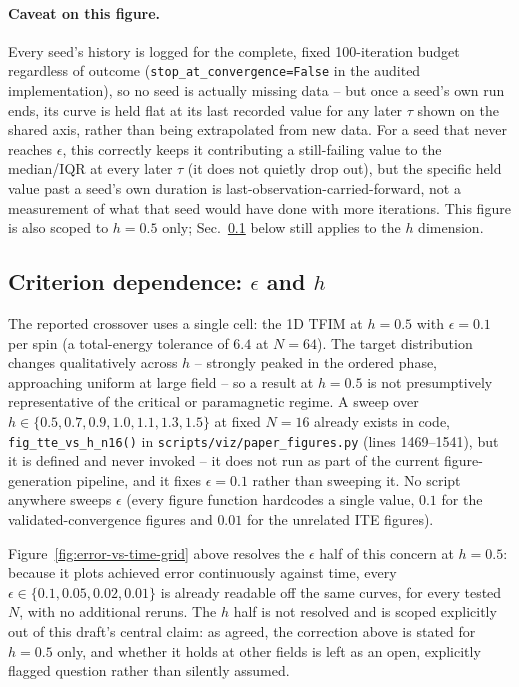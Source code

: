 \paragraph{Caveat on this figure.} Every seed's history is logged for the complete, fixed 100-iteration budget regardless of outcome (\texttt{stop\_at\_convergence=False} in the audited implementation), so no seed is actually missing data -- but once a seed's own run ends, its curve is held flat at its last recorded value for any later $\tau$ shown on the shared axis, rather than being extrapolated from new data. For a seed that never reaches $\epsilon$, this correctly keeps it contributing a still-failing value to the median/IQR at every later $\tau$ (it does not quietly drop out), but the specific held value past a seed's own duration is last-observation-carried-forward, not a measurement of what that seed would have done with more iterations. This figure is also scoped to $h=0.5$ only; Sec.~\ref{sec:eps-h} below still applies to the $h$ dimension.

\subsection{Criterion dependence: $\epsilon$ and $h$}
\label{sec:eps-h}

The reported crossover uses a single cell: the 1D TFIM at $h=0.5$ with $\epsilon=0.1$ per spin (a total-energy tolerance of $6.4$ at $N=64$). The target distribution changes qualitatively across $h$ -- strongly peaked in the ordered phase, approaching uniform at large field -- so a result at $h=0.5$ is not presumptively representative of the critical or paramagnetic regime. A sweep over $h\in\{0.5,0.7,0.9,1.0,1.1,1.3,1.5\}$ at fixed $N=16$ already exists in code, \texttt{fig\_tte\_vs\_h\_n16()} in \texttt{scripts/viz/paper\_figures.py} (lines 1469--1541), but it is defined and never invoked -- it does not run as part of the current figure-generation pipeline, and it fixes $\epsilon=0.1$ rather than sweeping it. No script anywhere sweeps $\epsilon$ (every figure function hardcodes a single value, $0.1$ for the validated-convergence figures and $0.01$ for the unrelated ITE figures).

Figure~\ref{fig:error-vs-time-grid} above resolves the $\epsilon$ half of this concern at $h=0.5$: because it plots achieved error continuously against time, every $\epsilon\in\{0.1,0.05,0.02,0.01\}$ is already readable off the same curves, for every tested $N$, with no additional reruns. The $h$ half is not resolved and is scoped explicitly out of this draft's central claim: as agreed, the correction above is stated for $h=0.5$ only, and whether it holds at other fields is left as an open, explicitly flagged question rather than silently assumed.

